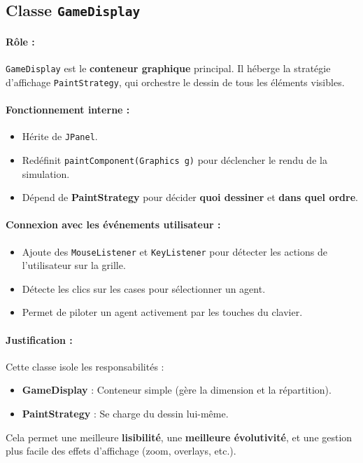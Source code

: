 \bigskip

\subsection{Classe \texttt{GameDisplay}}

\paragraph{Rôle :}  
\texttt{GameDisplay} est le \textbf{conteneur graphique} principal.  
Il héberge la stratégie d’affichage \texttt{PaintStrategy}, qui orchestre le dessin de tous les éléments visibles.

\paragraph{Fonctionnement interne :}
\begin{itemize}
    \item Hérite de \texttt{JPanel}.
    \item Redéfinit \texttt{paintComponent(Graphics g)} pour déclencher le rendu de la simulation.
    \item Dépend de \textbf{PaintStrategy} pour décider \textbf{quoi dessiner} et \textbf{dans quel ordre}.
\end{itemize}

\paragraph{Connexion avec les événements utilisateur :}
\begin{itemize}
    \item Ajoute des \texttt{MouseListener} et \texttt{KeyListener} pour détecter les actions de l’utilisateur sur la grille.
    \item Détecte les clics sur les cases pour sélectionner un agent.
    \item Permet de piloter un agent activement par les touches du clavier.
\end{itemize}

\paragraph{Justification :}
Cette classe isole les responsabilités :
\begin{itemize}
    \item \textbf{GameDisplay} : Conteneur simple (gère la dimension et la répartition).
    \item \textbf{PaintStrategy} : Se charge du dessin lui-même.
\end{itemize}
Cela permet une meilleure \textbf{lisibilité}, une \textbf{meilleure évolutivité}, et une gestion plus facile des effets d’affichage (zoom, overlays, etc.).

